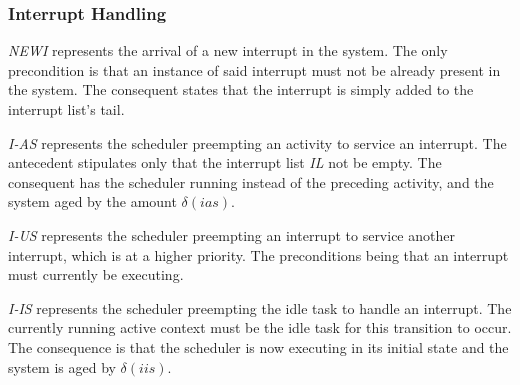 
\subsubsection{Interrupt Handling}
\emph{NEWI} represents the arrival of a new interrupt in the
system. The only precondition is that an instance of said interrupt
must not be already present in the system. The consequent states that
the interrupt is simply added to the interrupt list's tail.


\emph{I-AS} represents the scheduler preempting an activity to service
an interrupt. The antecedent stipulates only that the interrupt list
\emph{IL} not be empty. The consequent has the scheduler running
instead of the preceding activity, and the system aged by the amount
$\delta(ias)$. 


\emph{I-US} represents the scheduler preempting an interrupt to
service another interrupt, which is at a higher priority. The
preconditions being that an interrupt must currently be executing.

\emph{I-IS} represents the scheduler preempting the idle task to
handle an interrupt. The currently running active context must be the
idle task for this transition to occur. The consequence is that the
scheduler is now executing in its initial state and the system is aged
by $\delta(iis)$.

